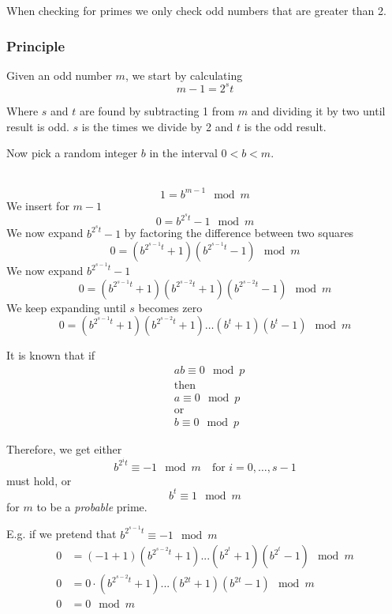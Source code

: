 When checking for primes we only check odd numbers that are greater
than 2.

\subsubsection*{Principle}
Given an odd number $m$, we start by calculating
\[ m - 1 =2^s t \]

Where $s$ and $t$ are found by subtracting 1 from $m$ and dividing it
by two until result is odd. $s$ is the times we divide by 2 and $t$ is
the odd result.

Now pick a random integer $b$ in the interval $0<b<m$.

 \notag\\
\[ 1 = b^{m-1} \mod m \]
We insert for $m-1$
\[ 0 = b^{2^{s}t}-1\mod m \]
We now expand $b^{2^{s}t} - 1$ by factoring the difference between two squares
\[ 0 = (b^{2^{s-1}t} + 1)(b^{2^{s-1}t} - 1) \mod m \]
We now expand $b^{2^{s-1}t}-1$
\[ 0 = (b^{2^{s-1}t} + 1)(b^{2^{s-2}t} + 1)(b^{2^{s-2}t} - 1) \mod m \]
We keep expanding until $s$ becomes zero
\[ 0 = (b^{2^{s-1}t} + 1)(b^{2^{s-2}t} + 1) \ldots (b^{t} + 1)(b^{t} - 1) \mod m \]

It is known that if \begin{align*}
&ab \equiv 0 \mod p\\
&\mbox{then}\\
&a \equiv 0 \mod p\\
&\mbox{or}\\
&b \equiv 0 \mod p
\end{align*}

Therefore, we get either
\[ b^{2^{i}t} \equiv -1 \mod m \quad \text{for } i = 0, \ldots, s-1 \]
must hold, or
\[ b^t \equiv 1 \mod m \]
for $m$ to be a \emph{probable} prime.

E.g. if we pretend that $b^{2^{s-1}t} \equiv -1 \mod m$
\begin{align*}
  0 &= (-1+1)(b^{2^{s-2}t}+1)...(b^{2^t}+1)(b^{2^t} - 1) \mod m \\
  0 &= 0 \cdot (b^{2^{s-2}t}+1)...(b^{2t}+1)(b^{2t} - 1) \mod m \\
  0 &= 0 \mod m \\
\end{align*}

